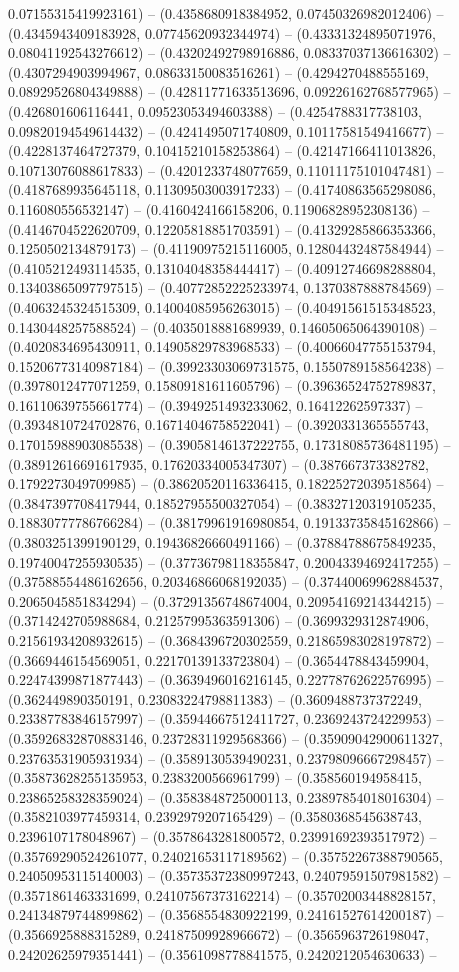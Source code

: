 0.07155315419923161) -- (0.4358680918384952, 0.07450326982012406) -- (0.4345943409183928, 0.07745620932344974) -- (0.43331324895071976, 0.08041192543276612) -- (0.43202492798916886, 0.08337037136616302) -- (0.4307294903994967, 0.08633150083516261) -- (0.4294270488555169, 0.08929526804349888) -- (0.42811771633513696, 0.09226162768577965) -- (0.426801606116441, 0.09523053494603388) -- (0.4254788317738103, 0.09820194549614432) -- (0.4241495071740809, 0.10117581549416677) -- (0.4228137464727379, 0.10415210158253864) -- (0.42147166411013826, 0.10713076088617833) -- (0.4201233748077659, 0.11011175101047481) -- (0.4187689935645118, 0.11309503003917233) -- (0.41740863565298086, 0.116080556532147) -- (0.4160424166158206, 0.11906828952308136) -- (0.4146704522620709, 0.12205818851703591) -- (0.41329285866353366, 0.1250502134879173) -- (0.41190975215116005, 0.12804432487584944) -- (0.4105212493114535, 0.13104048358444417) -- (0.40912746698288804, 0.13403865097797515) -- (0.40772852225233974, 0.1370387888784569) -- (0.4063245324515309, 0.14004085956263015) -- (0.40491561515348523, 0.1430448257588524) -- (0.4035018881689939, 0.14605065064390108) -- (0.4020834695430911, 0.14905829783968533) -- (0.40066047755153794, 0.15206773140987184) -- (0.39923303069731575, 0.1550789158564238) -- (0.3978012477071259, 0.15809181611605796) -- (0.39636524752789837, 0.16110639755661774) -- (0.3949251493233062, 0.16412262597337) -- (0.3934810724702876, 0.16714046758522041) -- (0.3920331365555743, 0.17015988903085538) -- (0.39058146137222755, 0.17318085736481195) -- (0.38912616691617935, 0.17620334005347307) -- (0.387667373382782, 0.1792273049709985) -- (0.38620520116336415, 0.18225272039518564) -- (0.3847397708417944, 0.18527955500327054) -- (0.38327120319105235, 0.18830777786766284) -- (0.38179961916980854, 0.19133735845162866) -- (0.3803251399190129, 0.19436826660491166) -- (0.37884788675849235, 0.19740047255930535) -- (0.37736798118355847, 0.20043394692417255) -- (0.37588554486162656, 0.20346866068192035) -- (0.37440069962884537, 0.2065045851834294) -- (0.37291356748674004, 0.20954169214344215) -- (0.3714242705988684, 0.21257995363591306) -- (0.3699329312874906, 0.21561934208932615) -- (0.3684396720302559, 0.21865983028197872) -- (0.3669446154569051, 0.22170139133723804) -- (0.3654478843459904, 0.22474399871877443) -- (0.3639496016216145, 0.22778762622576995) -- (0.362449890350191, 0.23083224798811383) -- (0.3609488737372249, 0.23387783846157997) -- (0.35944667512411727, 0.2369243724229953) -- (0.35926832870883146, 0.23728311929568366) -- (0.35909042900611327, 0.23763531905931934) -- (0.3589130539490231, 0.23798096667298457) -- (0.35873628255135953, 0.2383200566961799) -- (0.358560194958415, 0.23865258328359024) -- (0.3583848725000113, 0.23897854018016304) -- (0.3582103977459314, 0.2392979207165429) -- (0.3580368545638743, 0.2396107178048967) -- (0.3578643281800572, 0.23991692393517972) -- (0.35769290524261077, 0.24021653117189562) -- (0.35752267388790565, 0.24050953115140003) -- (0.35735372380997243, 0.24079591507981582) -- (0.3571861463331699, 0.24107567373162214) -- (0.35702003448828157, 0.24134879744899862) -- (0.3568554830922199, 0.24161527614200187) -- (0.3566925888315289, 0.24187509928966672) -- (0.3565963726198047, 0.24202625979351441) -- (0.3561098778841575, 0.2420212054630633) -- 